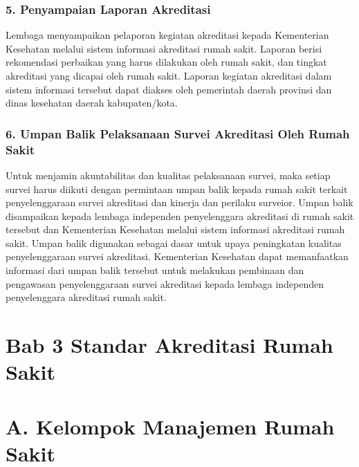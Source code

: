 \documentclass[
]{book}
\begin{document}
\hypertarget{penyampaian-laporan-akreditasi}{%
\subsection*{5. Penyampaian Laporan Akreditasi}\label{penyampaian-laporan-akreditasi}}

Lembaga menyampaikan pelaporan kegiatan akreditasi kepada Kementerian Kesehatan melalui sistem informasi akreditasi rumah sakit. Laporan berisi rekomendasi perbaikan yang harus dilakukan oleh rumah sakit, dan tingkat akreditasi yang dicapai oleh rumah sakit. Laporan kegiatan akreditasi dalam sistem informasi tersebut dapat diakses oleh pemerintah daerah provinsi dan dinas kesehatan daerah kabupaten/kota.

\hypertarget{umpan-balik-pelaksanaan-survei-akreditasi-oleh-rumah-sakit}{%
\subsection*{6. Umpan Balik Pelaksanaan Survei Akreditasi Oleh Rumah Sakit}\label{umpan-balik-pelaksanaan-survei-akreditasi-oleh-rumah-sakit}}

Untuk menjamin akuntabilitas dan kualitas pelaksanaan survei, maka setiap survei harus diikuti dengan permintaan umpan balik kepada rumah sakit terkait penyelenggaraan survei akreditasi dan kinerja dan perilaku surveior. Umpan balik disampaikan kepada lembaga independen penyelenggara akreditasi di rumah sakit tersebut dan Kementerian Kesehatan melalui sistem informasi akreditasi rumah sakit. Umpan balik digunakan sebagai dasar untuk upaya peningkatan kualitas penyelenggaraan survei akreditasi. Kementerian Kesehatan dapat memanfaatkan informasi dari umpan balik tersebut untuk melakukan pembinaan dan pengawasan penyelenggaraan survei akreditasi kepada lembaga independen penyelenggara akreditasi rumah sakit.

\hypertarget{bab-3-standar-akreditasi-rumah-sakit}{%
\chapter*{Bab 3 Standar Akreditasi Rumah Sakit}\label{bab-3-standar-akreditasi-rumah-sakit}}

\hypertarget{a.-kelompok-manajemen-rumah-sakit}{%
\chapter*{A. Kelompok Manajemen Rumah Sakit}\label{a.-kelompok-manajemen-rumah-sakit}}
\end{document}
